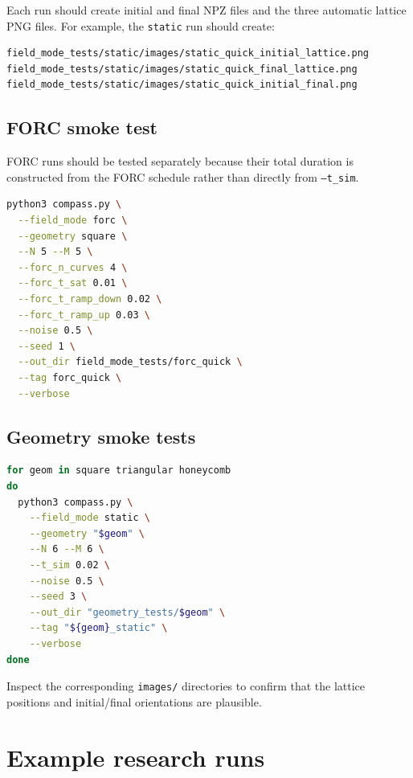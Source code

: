 \documentclass[11pt,a4paper]{article}
\newcommand{\code}[1]{\texttt{#1}}
\begin{document}
Each run should create initial and final NPZ files and the three automatic lattice PNG files. For example, the \code{static} run should create:

\begin{lstlisting}[language=bash]
field_mode_tests/static/images/static_quick_initial_lattice.png
field_mode_tests/static/images/static_quick_final_lattice.png
field_mode_tests/static/images/static_quick_initial_final.png
\end{lstlisting}

\subsection{FORC smoke test}

FORC runs should be tested separately because their total duration is constructed from the FORC schedule rather than directly from \code{--t\_sim}.

\begin{lstlisting}[language=bash]
python3 compass.py \
  --field_mode forc \
  --geometry square \
  --N 5 --M 5 \
  --forc_n_curves 4 \
  --forc_t_sat 0.01 \
  --forc_t_ramp_down 0.02 \
  --forc_t_ramp_up 0.03 \
  --noise 0.5 \
  --seed 1 \
  --out_dir field_mode_tests/forc_quick \
  --tag forc_quick \
  --verbose
\end{lstlisting}

\subsection{Geometry smoke tests}

\begin{lstlisting}[language=bash]
for geom in square triangular honeycomb
do
  python3 compass.py \
    --field_mode static \
    --geometry "$geom" \
    --N 6 --M 6 \
    --t_sim 0.02 \
    --noise 0.5 \
    --seed 3 \
    --out_dir "geometry_tests/$geom" \
    --tag "${geom}_static" \
    --verbose
done
\end{lstlisting}

Inspect the corresponding \code{images/} directories to confirm that the lattice positions and initial/final orientations are plausible.

\section{Example research runs}
\label{sec:examples}
\end{document}
